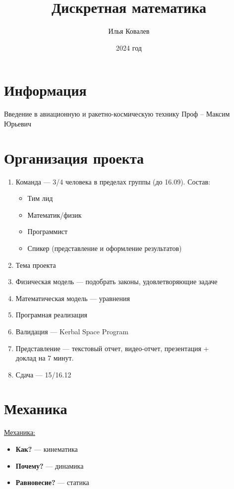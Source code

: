 \documentclass{article}
\begin{document}
\title{Дискретная математика}
\author{Илья Ковалев}
\date{2024 год}
\maketitle

\section{Информация}

Введение в авиационную и ракетно-космическую технику
Проф – Максим Юрьевич

\section{Организация проекта}

\begin{enumerate}
    \item Команда — 3/4 человека в пределах группы (до 16.09). Состав: \begin{itemize}
		\item Тим лид
		\item Математик/физик
		\item Программист
		\item Спикер (представление и оформление результатов)
	\end{itemize}
    \item Тема проекта
    \item Физическая модель — подобрать законы, удовлетворяющие задаче
    \item Математическая модель — уравнения
    \item Програмная реализация
    \item Валидация — Kerbal Space Program
    \item Представление — текстовый отчет, видео-отчет, презентация + \\
	доклад на 7 минут.
    \item Сдача — 15/16.12
\end{enumerate}

\section{Механика}

{\Large \underline{Механика:}}
\begin{itemize}
	\item \textbf{Как?} --- кинематика
	\item \textbf{Почему?} --- динамика
	\item \textbf{Равновесие?} --- статика
\end{itemize}
\end{document}
